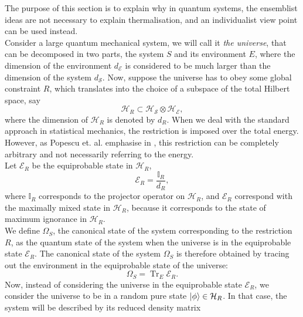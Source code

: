 The purpose of this section is to explain why in quantum systems, the ensemblist ideas are not necessary to explain thermalisation, and an individualist view point can be used instead.\\
\indent Consider a large quantum mechanical system, we will call it \textit{the universe}, that can be decomposed in two parts, the system $S$ and its environment $E$, where the dimension of the environment $d_{\mathcal{E}}$ is considered to be much larger than the  dimension of the system $d_{\mathcal{S}}$. Now, suppose the universe has to obey some global constraint $R$, which translates into the choice of a subspace of the total Hilbert space, say
 \begin{equation}
 \mathcal{H}_{R} \subset \mathcal{H}_{\mathcal{S}} \otimes \mathcal{H}_{\mathcal{E}},
 \label{CH1:Tipicality_1}
 \end{equation}
where the dimension of $\mathcal{H}_{R}$ is denoted  by  $d_R$. When we deal with the standard approach in statistical mechanics, the restriction is imposed over the total energy. However, as Popescu et. al. emphasise in \cite{popescu_entanglement_2006, popescu_foundations_2005}, this restriction can be completely arbitrary and not necessarily referring to the energy.\\
\indent Let $\mathcal{E}_R$ be the equiprobable state in $\mathcal{H}_{R}$,
\begin{equation}
\mathcal{E}_{R} = \frac{\mathbb{I}_R}{d_R},
\end{equation}
where $\mathbb{I}_R$ corresponds to the projector operator on $\mathcal{H}_R$, and $\mathcal{E}_R$ correspond with the maximally mixed state in $\mathcal{H}_R$, because it corresponds to the state of maximum ignorance in $\mathcal{H}_R$.\\
\indent We define $\Omega_S$, the canonical state of the system corresponding to the restriction $R$, as the quantum state of the system when the universe is in the equiprobable state $\mathcal{E}_R$. The canonical state of the system $\Omega_S$ is therefore obtained by tracing out the environment in the equiprobable state of the universe:
\begin{equation}
\Omega_{S}=\operatorname{Tr}_{E} \mathcal{E}_{R}.
\label{CH1:Canonical_state}
\end{equation}
Now, instead of considering the universe in the equiprobable state $\mathcal{E}_R$, we consider the universe to be in a random pure state $\mathinner{|{\phi}\rangle}\in \mathcal{H}_R$. In that case, the system will be described by its reduced density matrix
